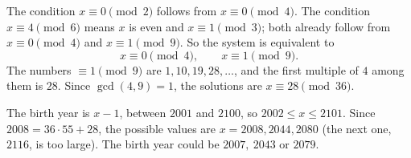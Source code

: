 The condition $x\equiv0\pmod 2$ follows from $x\equiv0\pmod4$. The condition $x\equiv4\pmod6$ means $x$ is even and $x\equiv1\pmod3$; both already follow from $x\equiv0\pmod4$ and $x\equiv1\pmod9$. So the system is equivalent to
\[x\equiv0\pmod4,\qquad x\equiv1\pmod9.\]
The numbers $\equiv1\pmod9$ are $1,10,19,28,\dots$, and the first multiple of $4$ among them is $28$. Since $\gcd(4,9)=1$, the solutions are $x\equiv28\pmod{36}$.

The birth year is $x-1$, between $2001$ and $2100$, so $2002\le x\le2101$. Since $2008=36\cdot55+28$, the possible values are $x=2008,2044,2080$ (the next one, $2116$, is too large). The birth year could be $\boxed{2007,\ 2043\text{ or }2079}$.
